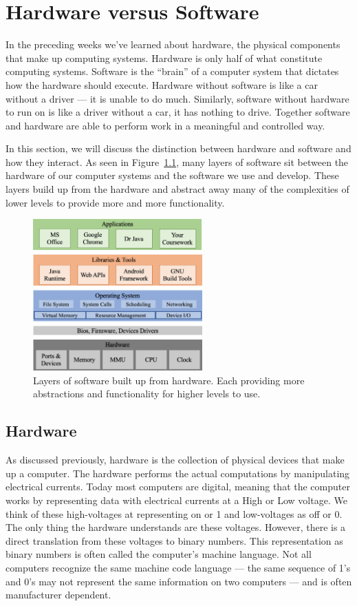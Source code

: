 \chapter{Hardware versus Software}

In the preceding weeks we've learned about hardware, the physical components that make up computing
systems. Hardware is only half of what constitute computing systems. Software is the ``brain'' of
a computer system that dictates how the hardware should execute. Hardware without software is like
a car without a driver --- it is unable to do much. Similarly, software without hardware to run on
is like a driver without a car, it has nothing to drive. Together software and hardware are able to
perform work in a meaningful and controlled way.

In this section, we will discuss the distinction between hardware and software and how they
interact. As seen in Figure~\ref{fig:hw_sw:layers}, many layers of software sit between the hardware of
our computer systems and the software we use and develop. These layers build up from the hardware and
abstract away many of the complexities of lower levels to provide more and more functionality.

\begin{figure}
\centering
\includegraphics[width=6.5cm]{images/software_layers.png}
\caption{Layers of software built up from hardware. Each providing more abstractions and functionality for higher levels to use.}
\label{fig:hw_sw:layers}
\end{figure}

\section{Hardware}
As discussed previously, hardware is the collection of physical devices that make up a computer.
The hardware performs the actual computations by manipulating electrical currents. Today most
computers are digital, meaning that the computer works by representing data with electrical currents
at a High or Low voltage. We think of these high-voltages at representing on or 1 and low-voltages
as off or 0. The only thing the hardware understands are these voltages. However, there is a direct
translation from these voltages to binary numbers. This representation as binary numbers is often
called the computer's machine language. Not all computers recognize the same machine code language ---
the same sequence of 1's and 0's may not represent the same information on two computers ---
and is often manufacturer dependent.

